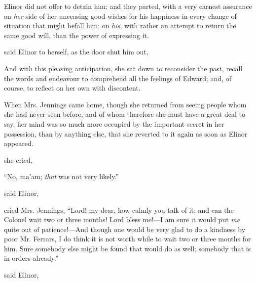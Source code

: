 Elinor did not offer to detain him; and they parted, with a very earnest assurance on {\em her} side of her unceasing good wishes for his happiness in every change of situation that might befall him; on {\em his}, with rather an attempt to return the same good will, than the power of expressing it.

 said Elinor to herself, as the door shut him out, 

And with this pleasing anticipation, she sat down to reconsider the past, recall the words and endeavour to comprehend all the feelings of Edward; and, of course, to reflect on her own with discontent.

When Mrs. Jennings came home, though she returned from seeing people whom she had never seen before, and of whom therefore she must have a great deal to say, her mind was so much more occupied by the important secret in her possession, than by anything else, that she reverted to it again as soon as Elinor appeared.

 she cried, 

“No, ma'am; {\em that} was not very likely.”


 said Elinor, 

 cried Mrs. Jennings; “Lord! my dear, how calmly you talk of it; and can the Colonel wait two or three months! Lord bless me!---I am sure it would put {\em me} quite out of patience!---And though one would be very glad to do a kindness by poor Mr. Ferrars, I do think it is not worth while to wait two or three months for him. Sure somebody else might be found that would do as well; somebody that is in orders already.”

 said Elinor, 


